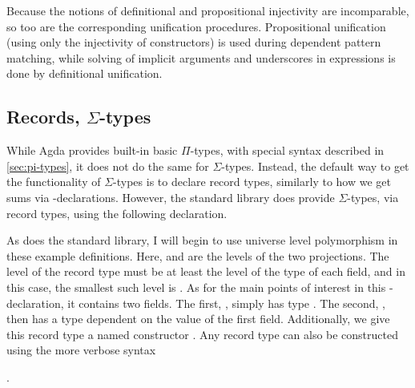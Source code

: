 Because the notions of definitional and propositional injectivity are
incomparable, so too are the corresponding unification procedures.
Propositional unification (using only the injectivity of constructors) is used
during dependent pattern matching, while solving of implicit arguments and
underscores in expressions is done by definitional unification.

\subsection{Records, $\Sigma$-types}\label{sec:records}

While Agda provides built-in basic $\Pi$-types, with special syntax described in
\cref{sec:pi-types}, it does not do the same for $\Sigma$-types.
Instead, the default way to get the functionality of $\Sigma$-types is to
declare record types, similarly to how we get sums via
-declarations.
However, the standard library does provide $\Sigma$-types, via record types,
using the following declaration.


As does the standard library, I will begin to use universe level polymorphism in
these example definitions.
Here,  and  are the levels of the two projections.
The level of the record type must be at least the level of the type of each
field, and in this case, the smallest such level is
\AgdaSpace{}\AgdaOperator{\AgdaPrimitive{$\sqcup$}}\AgdaSpace{}%
.
As for the main points of interest in this -declaration, it
contains two fields.
The first, , simply has type .
The second, , then has a type dependent on the value of the
first field.
Additionally, we give this record type a named constructor
\AgdaInductiveConstructor{\_,\_}.
Any record type can also be constructed using the more verbose syntax
\begin{code}[inline]%
\>[0]\AgdaSpace{}%
\AgdaSymbol{\{}\AgdaSpace{}%
\AgdaSpace{}%
\AgdaSymbol{=}\AgdaSpace{}%
\AgdaSpace{}%
\AgdaSymbol{;}\AgdaSpace{}%
\AgdaSpace{}%
\AgdaSymbol{=}\AgdaSpace{}%
\AgdaSpace{}%
\AgdaSymbol{\}}\<%
\end{code}.

